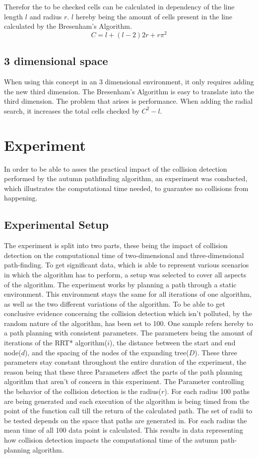 Therefor the to be checked cells can be calculated in dependency of the line length $l$ and radius $r$. $l$ hereby being the amount of cells present in the line calculated by the Bresenham's Algorithm. 
\[C=l+(l-2)2r+r\pi^2\]

\subsection{3 dimensional space}
When using this concept in an 3 dimensional environment, it only requires adding the new third dimension. The Bresenham's Algorithm is easy to translate into the third dimension. The problem that arises is performance. When adding the radial search, it increases the total cells checked by \(C^2 - l\).  

\section{Experiment}

In order to be able to asses the practical impact of the collision detection performed by the autumn pathfinding algorithm, an experiment was conducted, which illustrates the computational time needed, to guarantee no collisions from happening.

\subsection{Experimental Setup}

The experiment is split into two parts, these being the impact of collision detection on the computational time of two-dimensional and three-dimensional path-finding.
To get significant data, which is able to represent various scenarios in which the algorithm has to perform, a setup was selected to cover all aspects of the algorithm. The experiment works by planning a path through a static environment. This environment stays the same for all iterations of one algorithm, as well as the two different variations of the algorithm. To be able to get conclusive evidence concerning the collision detection which isn't polluted, by the random nature of the algorithm, has been set to 100. One sample refers hereby to a path planning with consistent parameters. The parameters being the amount of iterations of the RRT* algorithm($i$), the distance between the start and end node($d$), and the spacing of the nodes of the expanding tree($D$). These three parameters stay constant throughout the entire duration of the experiment, the reason being that these three Parameters affect the parts of the path planning algorithm that aren't of concern in this experiment. The Parameter controlling the behavior of the collision detection is the radius($r$).
For each radius 100 paths are being generated and each execution of the algorithm is being timed from the point of the function call till the return of the calculated path. 
The set of radii to be tested depends on the space that paths are generated in.
For each radius the mean time of all 100 data point is calculated. This results in data representing how collision detection impacts the computational time of the autumn path-planning algorithm.

